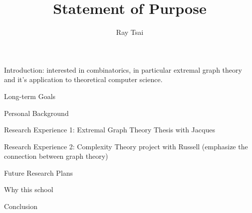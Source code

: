 \documentclass[12pt]{article}
\title{Statement of Purpose}
\author{Ray Tsai}
\date{}
\begin{document}
\maketitle

Introduction: interested in combinatorics, in particular extremal graph theory and it's application
to theoretical computer science.

Long-term Goals

Personal Background

Research Experience 1: Extremal Graph Theory Thesis with Jacques

Research Experience 2: Complexity Theory project with Russell (emphasize the connection between
graph theory)

Future Research Plans

Why this school

Conclusion
\end{document}
